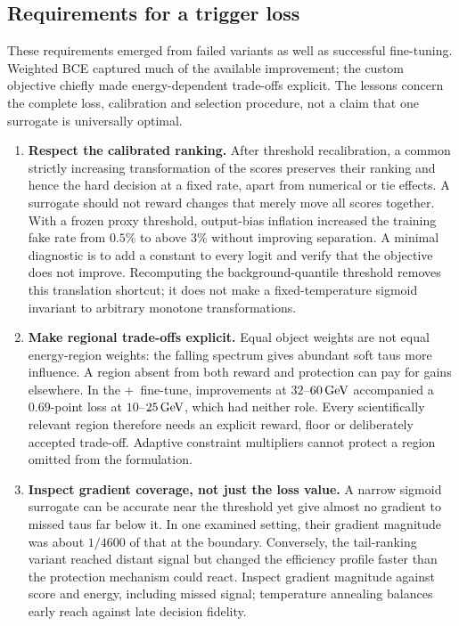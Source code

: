 \subsection{Requirements for a trigger loss}
\label{app:loss_requirements}
These requirements emerged from failed variants as well as successful fine-tuning. Weighted BCE captured much of the available improvement; the custom objective chiefly made energy-dependent trade-offs explicit. The lessons concern the complete loss, calibration and selection procedure, not a claim that one surrogate is universally optimal.
\begin{enumerate}[label=(\arabic*),itemsep=3pt]
  \item \textbf{Respect the calibrated ranking.}
  After threshold recalibration, a common strictly increasing transformation of the scores preserves their ranking and hence the hard decision at a fixed rate, apart from numerical or tie effects. A surrogate should not reward changes that merely move all scores together. With a frozen proxy threshold, output-bias inflation increased the training fake rate from $0.5\%$ to above $3\%$ without improving separation. A minimal diagnostic is to add a constant to every logit and verify that the objective does not improve. Recomputing the background-quantile threshold removes this translation shortcut; it does not make a fixed-temperature sigmoid invariant to arbitrary monotone transformations.

  \item \textbf{Make regional trade-offs explicit.}
  Equal object weights are not equal energy-region weights: the falling spectrum gives abundant soft taus more influence. A region absent from both reward and protection can pay for gains elsewhere. In the \SUM+\Ffeat\ fine-tune, improvements at $32$--$60\,\mathrm{GeV}$ accompanied a $0.69$-point loss at $10$--$25\,\mathrm{GeV}$, which had neither role. Every scientifically relevant region therefore needs an explicit reward, floor or deliberately accepted trade-off. Adaptive constraint multipliers cannot protect a region omitted from the formulation.

  \item \textbf{Inspect gradient coverage, not just the loss value.}
  A narrow sigmoid surrogate can be accurate near the threshold yet give almost no gradient to missed taus far below it. In one examined setting, their gradient magnitude was about $1/4600$ of that at the boundary. Conversely, the tail-ranking variant reached distant signal but changed the efficiency profile faster than the protection mechanism could react. Inspect gradient magnitude against score and energy, including missed signal; temperature annealing balances early reach against late decision fidelity.


\end{enumerate}
